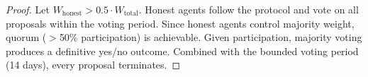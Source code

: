 \documentclass{article}
\begin{document}
\begin{proof}
Let $W_{\text{honest}} > 0.5 \cdot W_{\text{total}}$. Honest agents follow the protocol and vote on all proposals within the voting period. Since honest agents control majority weight, quorum ($>$50\% participation) is achievable. Given participation, majority voting produces a definitive yes/no outcome. Combined with the bounded voting period (14 days), every proposal terminates.
\end{proof}
\end{document}

